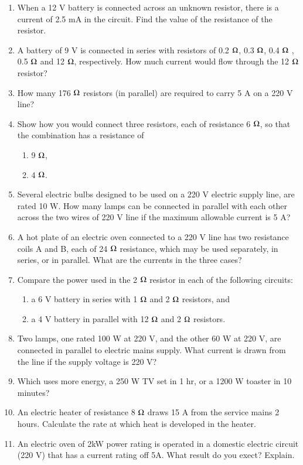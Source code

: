\begin{enumerate}[label=\arabic*.,ref=\thesection.\theenumi]
%
\item  When a 12 V battery is connected across an unknown resistor, there is a current of 2.5 mA in the circuit. Find the value of the resistance of the resistor.
\item  A battery of 9 V is connected in series with resistors of 0.2 $\ohm$, 0.3 $\ohm$, 0.4 $\ohm$ , 0.5 $\ohm$ and 12 $\ohm$, respectively. How much current would flow through the 12 $\ohm$ resistor?
\item  How many 176 $\ohm$ resistors (in parallel) are required to carry 5 A on a 220 V line? 
\item  Show how you would connect three resistors, each of resistance 6 $\ohm$, so that the combination has a resistance of \begin{enumerate} \item  9 $\ohm$, \item 4 $\ohm$.\end{enumerate}
\item  Several electric bulbs designed to be used on a 220 V electric supply line, are rated 10 W. How many lamps can be connected in parallel with each other across the two wires of 220 V line if the maximum allowable current is 5 A?
\item  A hot plate of an electric oven connected to a 220 V line has two resistance coils A and B, each of 24 $\ohm$ resistance, which may be used separately, in series, or in parallel. What are the currents in the three cases?
\item  Compare the power used in the 2 $\ohm$ resistor in each of the following circuits: \begin{enumerate} \item  a 6 V battery in series with 1 $\ohm$ and 2 $\ohm$ resistors, and \item a 4 V battery in parallel with 12 $\ohm$ and 2 $\ohm$ resistors.\end{enumerate}
\item Two lamps, one rated 100 W at 220 V, and the other 60 W at 220 V, are connected in parallel to electric mains supply. What current is drawn from the line if the supply voltage is 220 V?
\item Which uses more energy, a 250 W TV set in 1 hr, or a 1200 W toaster in 10 minutes? 
\item  An electric heater of resistance 8 $\ohm$ draws 15 A from the service mains 2 hours. Calculate the rate at which heat is developed in the heater.
\item An electric oven of 2kW power rating is operated in a domestic electric circuit (220 V) that has a current rating off 5A.  What result do you exect? Explain.

\end{enumerate}
